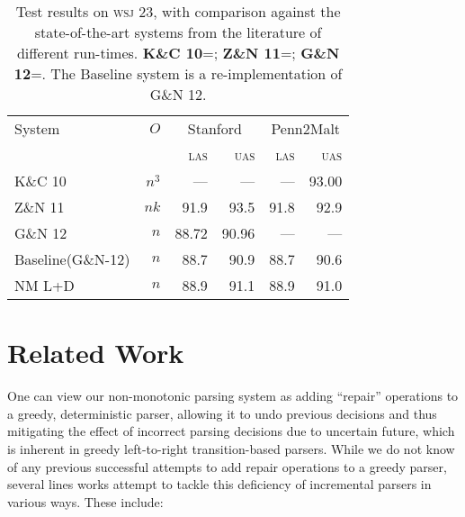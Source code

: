 \documentclass[11pt,letterpaper]{article}
\newcommand{\las}{\textsc{las}\xspace}
\newcommand{\uas}{\textsc{uas}\xspace}
\newcommand{\wsj}{\textsc{wsj}\xspace}
\begin{document}
\begin{table}
    \centering
    \small
    \begin{tabular}{l|r|rr|rr}
        \hline 
System  &   $O$ &  \multicolumn{2}{c}{Stanford} & \multicolumn{2}{|c}{Penn2Malt} \\
        &       &  \las  & \uas  & \las & \uas \\
        \hline \hline
K\&C 10  & $n^3$ & ---   & ---   & ---  & 93.00 \\
Z\&N 11  & $nk$  & 91.9  & 93.5  & 91.8 & 92.9 \\
G\&N 12  & $n$   & 88.72 & 90.96 & ---  & --- \\
        \hline
Baseline(G\&N-12)   & $n$ & 88.7 & 90.9 & 88.7  & 90.6 \\
NM L+D      & $n$ & 88.9 & 91.1 & 88.9  & 91.0 \\
\hline
    \end{tabular}
    \caption{\small Test results on \wsj 23, with comparison against the
        state-of-the-art systems from the literature of different run-times.
        \textbf{K\&C 10}=\citet{koo:10}; \textbf{Z\&N 11}=\citet{zhang:11};
        \textbf{G\&N 12}=\citet{goldberg:12}. The Baseline system is a re-implementation
             of G\&N 12.\label{tab:eval}}
\end{table}

\section{Related Work}

One can view our non-monotonic parsing system as adding ``repair'' operations to a greedy, deterministic parser, allowing it to undo previous decisions and thus mitigating the effect of incorrect parsing decisions due to uncertain future, which is inherent in greedy left-to-right transition-based parsers. 
While we do not know of any previous successful attempts to add repair operations to a greedy parser, several lines works attempt to tackle this deficiency of incremental parsers in various ways. These include:
\end{document}
